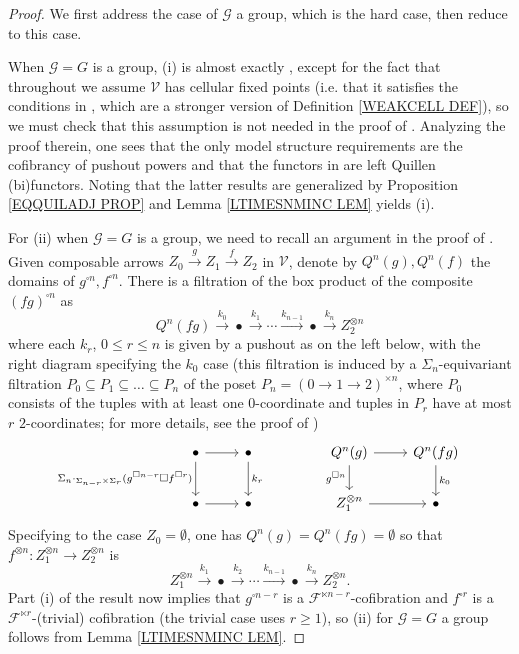 \documentclass[a4paper,10pt
,draft
]{article}%
\numberwithin{equation}{section}
\numberwithin{figure}{section}
\theoremstyle{definition} %
\newcommand{\F}{\ensuremath{\mathcal F}}
\newcommand{\V}{\ensuremath{\mathcal V}}
\newcommand{\G}{\ensuremath{\mathcal G}}
\newcommand{\1}{\ensuremath{\mathbbm 1}}%
\begin{document}
\begin{proof}
	We first address the case of $\G$ a group, 
	which is the hard case, then reduce to this case.
	
	When $\G = G$ is a group, 
	(i) is almost exactly \cite[Prop. 6.24]{BP_geo}, 
	except for the fact that throughout \cite{BP_geo}
	we assume $\V$ has cellular fixed points
	(i.e. that it satisfies the conditions in 
	\cite[Prop. 2.6]{Ste16}, which are a stronger version of Definition \ref{WEAKCELL DEF}), 
	so we must check that this assumption is not needed in the proof of 
	\cite[Prop. 6.24]{BP_geo}.
	Analyzing the proof therein, one sees that the only model structure requirements are the cofibrancy of pushout powers
	and that the functors in 
	\cite[Props 6.5 and 6.23]{BP_geo}
	are left Quillen (bi)functors.
	Noting that the latter results are generalized by Proposition \ref{EQQUILADJ PROP} and Lemma \ref{LTIMESNMINC LEM} yields (i).
	
	
	
	For (ii) when $\G=G$ is a group, we need to recall an argument 
	in the proof of \cite[Prop. 6.25]{BP_geo}. 
	Given composable arrows $Z_0 \xrightarrow{g} Z_1 \xrightarrow{f} Z_2$ in $\V$,
	denote by $Q^n(g), Q^n(f)$ the domains of $g^{\square n}, f^{\square n}$.
	There is a filtration of the box product of the composite
	$(fg)^{\square n}$ as
	\[
	Q^n(fg)
	\xrightarrow{k_0}
	\bullet
	\xrightarrow{k_1}
	\cdots
	\xrightarrow{k_{n-1}}
	\bullet
	\xrightarrow{k_{n}}
	Z_2^{\otimes n}
	\] 
	where each $k_r$, $0\leq r \leq n$ is given by a pushout as on the left below, with the right diagram specifying the $k_0$ case
	(this filtration is induced by a $\Sigma_n$-equivariant filtration 
	$P_0 \subseteq P_1 \subseteq \dots \subseteq P_n$ of the poset $P_n = (0 \to 1 \to 2)^{\times n}$,
	where $P_0$ consists of the tuples with at least one $0$-coordinate 
	and tuples in $P_r$ have at most $r$ $2$-coordinates;
	for more details, see the proof of \cite[Lemma 4.8]{Pe16})
	\begin{equation}\label{HGBOX_EQ}
	\begin{tikzcd}
	\bullet 
	\arrow[d, "\Sigma_n \cdot_{\Sigma_{n-r} \times \Sigma_r} (g^{\square n-r} \square f^{\square r})"'] \arrow[r]
	&
	\bullet \arrow[d, "k_r"]
	& &%
	Q^n(g) \arrow[r] \arrow[d, "g^{\square n}"']
	&
	Q^n(fg) \arrow[d, "k_0"]
	\\
	\bullet \arrow[r]
	&
	\bullet
	& &%
	Z_1^{\otimes n} \arrow[r]
	&
	\bullet
	\end{tikzcd}
	\end{equation}
	Specifying to the case $Z_0 = \emptyset$, one has
	$Q^n(g)= Q^n(fg) = \emptyset$
	so that $f^{\otimes n} \colon Z_1^{\otimes n} \to Z_2^{\otimes n}$
	is
	\[
	Z_1^{\otimes n}
	\xrightarrow{k_1}
	\bullet
	\xrightarrow{k_2}
	\cdots
	\xrightarrow{k_{n-1}}
	\bullet
	\xrightarrow{k_{n}}
	Z_2^{\otimes n}.
	\] 
	Part (i) of the result now implies that 
	$g^{\square n-r}$
	is a $\F^{\ltimes n-r}$-cofibration
	and
	$f^{\square r}$
	is a $\F^{\ltimes r}$-(trivial) cofibration
	(the trivial case uses $r\geq 1$),
	so (ii) for $\G=G$ a group follows from 
	Lemma \ref{LTIMESNMINC LEM}.
	

\end{proof}
\end{document}
